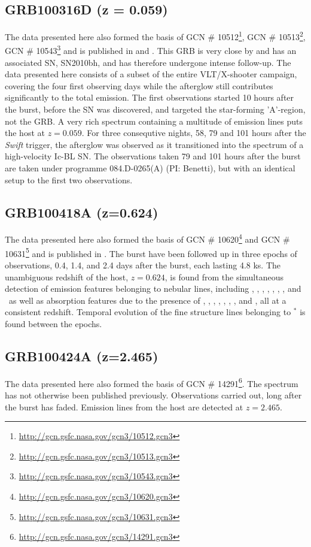 \documentclass{aa}    %
\begin{document}
\subsection{GRB100316D (z = 0.059)}
The data presented here also formed the basis of GCN \#
10512\footnote{\url{http://gcn.gsfc.nasa.gov/gcn3/10512.gcn3}}, GCN \#
10513\footnote{\url{http://gcn.gsfc.nasa.gov/gcn3/10513.gcn3}}, GCN \#
10543\footnote{\url{http://gcn.gsfc.nasa.gov/gcn3/10543.gcn3}} and is published
in \citet{Bufano2012} and \citet{Starling2011}. This GRB is very close by and
has an associated SN, SN2010bh, and has therefore undergone intense follow-up. The data
presented here consists of a subset of the entire VLT/X-shooter campaign,
covering the four first observing days while the afterglow still contributes
significantly to the total emission. The first observations started 10 hours
after the burst, before the SN was discovered, and targeted the star-forming
'A'-region\citep{Starling2011}, not the GRB. A very rich spectrum containing a
multitude of emission lines puts the host at $z = 0.059$. For three consequtive
nights, 58, 79 and 101 hours after the \textit{Swift} trigger, the afterglow
was observed as it transitioned into the spectrum of a high-velocity Ic-BL SN.
The observations taken 79 and 101 hours after the burst are taken under
programme 084.D-0265(A) (PI: Benetti), but with an identical setup to the first
two observations.

\subsection{GRB100418A (z=0.624)}
The data presented here also formed the basis of GCN \#
10620\footnote{\url{http://gcn.gsfc.nasa.gov/gcn3/10620.gcn3}} and GCN \#
10631\footnote{\url{http://gcn.gsfc.nasa.gov/gcn3/10631.gcn3}} and is published
in \citet{DeUgartePostigo2011}. The burst have been followed up in three epochs
of observations, 0.4, 1.4, and 2.4 days after the burst, each lasting 4.8 ks.
The unambiguous redshift of the host, $z=0.624$, is found from the simultaneous
detection of emission features belonging to nebular lines, including \hi, \oii,
\oiii, \neiii, \nii, \sii, \siii, and \hei~as well as absorption features due
to the presence of \znii, \crii, \feii, \mnii, \mgii, \mgi, \tiii, and \caii,
all at a consistent redshift. Temporal evolution of the fine structure lines
belonging to \feii$^*$ is found between the epochs.

\subsection{GRB100424A (z=2.465)}
The data presented here also formed the basis of GCN \#
14291\footnote{\url{http://gcn.gsfc.nasa.gov/gcn3/14291.gcn3}}. The spectrum
has not otherwise been published previously. Observations carried out, long
after the burst has faded.  Emission lines from the host are detected at
$z=2.465$.
\end{document}
